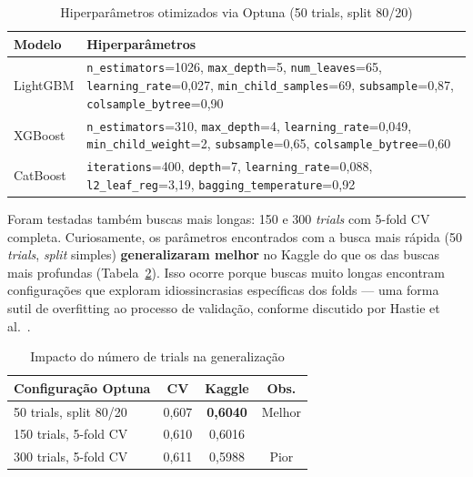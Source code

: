 \documentclass[12pt, a4paper]{article}
\newcommand{\code}[1]{\texttt{#1}}
\begin{document}
\begin{table}[H]
  \centering
  \caption{Hiperparâmetros otimizados via Optuna (50 trials, split 80/20)}
  \label{tab:hyperparams}
  \small{}
  \begin{tabular}{lp{10.5cm}}
    \toprule
    \rowcolor{headerblue}
    \color{white}\textbf{Modelo} & \color{white}\textbf{Hiperparâmetros} \\
    \midrule
    LightGBM & \code{n\_estimators}=1026, \code{max\_depth}=5, \code{num\_leaves}=65, \code{learning\_rate}=0,027, \code{min\_child\_samples}=69, \code{subsample}=0,87, \code{colsample\_bytree}=0,90 \\
    XGBoost  & \code{n\_estimators}=310, \code{max\_depth}=4, \code{learning\_rate}=0,049, \code{min\_child\_weight}=2, \code{subsample}=0,65, \code{colsample\_bytree}=0,60 \\
    CatBoost & \code{iterations}=400, \code{depth}=7, \code{learning\_rate}=0,088, \code{l2\_leaf\_reg}=3,19, \code{bagging\_temperature}=0,92 \\
    \bottomrule
  \end{tabular}
\end{table}

Foram testadas também buscas mais longas: 150 e 300 \textit{trials} com 5-fold CV completa. Curiosamente, os parâmetros encontrados com a busca mais rápida (50 \textit{trials}, \textit{split} simples) \textbf{generalizaram melhor} no Kaggle do que os das buscas mais profundas (Tabela~\ref{tab:optuna_comp}). Isso ocorre porque buscas muito longas encontram configurações que exploram idiossincrasias específicas dos folds --- uma forma sutil de overfitting ao processo de validação, conforme discutido por Hastie et al.~\cite{ref:hastie}.

\begin{table}[H]
  \centering
  \caption{Impacto do número de trials na generalização}
  \label{tab:optuna_comp}
  \small{}
  \begin{tabular}{lccc}
    \toprule
    \rowcolor{headerblue}
    \color{white}\textbf{Configuração Optuna} & \color{white}\textbf{CV} & \color{white}\textbf{Kaggle} & \color{white}\textbf{Obs.} \\
    \midrule
    50 trials, split 80/20     & 0,607 & \textbf{0,6040} & Melhor \\
    150 trials, 5-fold CV      & 0,610 & 0,6016 & \\
    300 trials, 5-fold CV      & 0,611 & 0,5988 & Pior \\
    \bottomrule
  \end{tabular}
\end{table}
\end{document}
